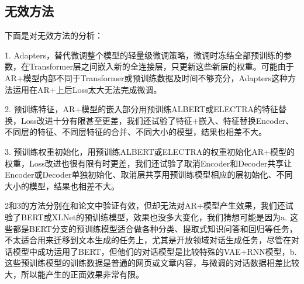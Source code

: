 \documentclass[letterpaper]{article} %
\DeclareRobustCommand{\citeext}[1]{\cite[#1]{#1}}
\begin{document}
\begin{CJK*}{UTF8}{gbsn}
\begin{table*} [b]
\centering
\caption{实验结果，加粗的数据为改进指标}
\label{tab:result-comparisons}
\end{table*}


\subsection[Ineffective Methods]{无效方法} 
下面是对无效方法的分析：

1. Adapters\citeext{Houlsby2019}，替代微调整个模型的轻量级微调策略，微调时冻结全部预训练的参数，在Transformer层之间嵌入新的全连接层，只更新这些新层的权重。可能由于AR+模型内部不同于Transformer或预训练数据及时间不够充分，Adapters这种方法运用在AR+上后Loss太大无法完成微调。

2. 预训练特征\citeext{Devlin2019}，AR+模型的嵌入部分用预训练ALBERT\citeext{Lan2019}或ELECTRA\citeext{Clark2020}的特征替换，Loss改进十分有限甚至更差，我们还试验了特征+嵌入、特征替换Encoder、不同层的特征、不同层特征的合并、不同大小的模型，结果也相差不大。

3. 预训练权重初始化\citeext{Ziegler2019}，用预训练ALBERT或ELECTRA的权重初始化AR+模型的权重，Loss改进也很有限有时更差，我们还试验了取消Encoder和Decoder共享让Encoder或Decoder单独初始化、取消层共享用预训练模型相应的层初始化、不同大小的模型，结果也相差不大。

2和3的方法分别在\citeext{Devlin2019}和\citeext{Zhao2019}论文中验证有效，但却无法对AR+模型产生效果，我们还试验了BERT或XLNet\citeext{Yang2019}的预训练模型，效果也没多大变化，我们猜想可能是因为a. 这些都是BERT分支的预训练模型适合做各种分类、提取式知识问答和回归等任务，不太适合用来迁移到文本生成的任务上，尤其是开放领域对话生成任务，尽管\citeext{Zhao2019}在对话模型中成功运用了BERT，但他们的对话模型是比较特殊的VAE+RNN模型，b. 这些预训练模型的训练数据是普通的网页或文章内容，与微调的对话数据相差比较大，所以能产生的正面效果非常有限。


\end{CJK*}
\end{document}
